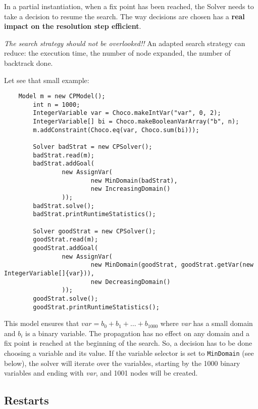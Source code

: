 In a partial instantiation, when a fix point has been reached, the Solver needs to take a decision to resume the search. The way decisions are chosen has a \textbf{real impact on the resolution step efficient}. 
\begin{note}
\emph{The search strategy should not be overlooked!!}
An adapted search strategy can reduce: the execution time, the number of node expanded, the number of backtrack done.
\end{note}
Let see that small example:
\begin{lstlisting}
	Model m = new CPModel();
        int n = 1000;
        IntegerVariable var = Choco.makeIntVar("var", 0, 2);
        IntegerVariable[] bi = Choco.makeBooleanVarArray("b", n);
        m.addConstraint(Choco.eq(var, Choco.sum(bi)));

        Solver badStrat = new CPSolver();
        badStrat.read(m);
        badStrat.addGoal(
                new AssignVar(
                        new MinDomain(badStrat), 
                        new IncreasingDomain()
                ));
        badStrat.solve();
        badStrat.printRuntimeStatistics();

        Solver goodStrat = new CPSolver();
        goodStrat.read(m);
        goodStrat.addGoal(
                new AssignVar(
                        new MinDomain(goodStrat, goodStrat.getVar(new IntegerVariable[]{var})), 
                        new DecreasingDomain()
                ));
        goodStrat.solve();
        goodStrat.printRuntimeStatistics();
\end{lstlisting}

This model ensures that $var = b_{0} + b_{1} + \ldots + b_{1000}$ where \emph{var} has a small domain and $b_{i}$ is a binary variable. The propagation has no effect on any domain and a fix point is reached at the beginning of the search. So, a decision has to be done choosing a variable and its value. If the variable selector is set to \texttt{MinDomain} (see below), the solver will iterate over the variables, starting by the 1000 binary variables and ending with \emph{var}, and 1001 nodes will be created.

\subsection{Restarts}\label{solver:restarts}\hypertarget{solver:restarts}{}

